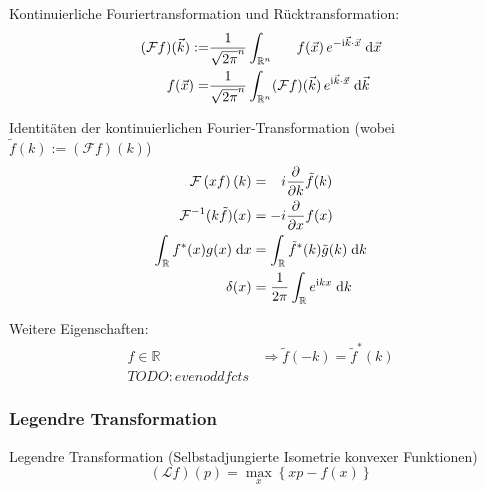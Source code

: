 \documentclass[11pt]{article}
\numberwithin{equation}{section}
\begin{document}
				\noindent
				Kontinuierliche Fouriertransformation und Rücktransformation:
				\begin{equation}
					\begin{aligned}
						(\mathcal{F}f)(\vec{k}) :=& \frac{1}{\sqrt{2\pi}^n}\int_{\mathbb{R}^n} \phantom{(\mathcal{F})}f(\vec{x})\, e^{-\i\vec{k}\cdot\vec{x}}\;\diff\vec{x} \\
						\phantom{(\mathcal{F})}f(\vec{x}) =& \frac{1}{\sqrt{2\pi}^n}\int_{\mathbb{R}^n} (\mathcal{F}f)(\vec{k}) \,e^{\i\vec{k}\cdot\vec{x}}\;\diff \vec{k} \\
					\end{aligned}
				\end{equation}

				\noindent
				Identitäten der kontinuierlichen Fourier-Transformation (wobei $\tilde{f}(k) := \left(\mathcal{F}f\right)(k)$)
				\begin{equation}
					\begin{aligned}
						\mathcal{F}\left(xf\right)(k) &= \phantom{-}i \frac{\partial }{\partial k}\tilde{f}(k) \\
						\mathcal{F}^{-1}(k\tilde{f})(x) &= -i\frac{\partial }{\partial x}f(x) \\
						\int_{\mathbb{R}} f^{*}(x) g(x)\;\mathrm{d} x &=
						\int_{\mathbb{R}}\tilde{f}^{*}(k)\tilde{g}(k)\;\mathrm{d} k \\
						\delta(x) &= \frac{1}{2\pi}\int_{\mathbb{R}}e^{\mathrm{i} kx}\;\mathrm{d} k \\
						\label{eq:fourierIdentities}
					\end{aligned}
				\end{equation}

				\noindent
				Weitere Eigenschaften:
				\begin{equation}
					\begin{aligned}
						f\in\mathbb{R}
						&\Rightarrow \tilde{f}(-k)=\tilde{f}^*(k) \\
						TODO: even odd fcts
					\end{aligned}
				\end{equation}

			\subsubsection{Legendre Transformation}
				\noindent
				Legendre Transformation (Selbstadjungierte Isometrie konvexer Funktionen)
				\begin{equation}
					(\mathcal{L}f)(p)=\max_x\left\lbrace xp-f(x) \right\rbrace
				\end{equation}
\end{document}
